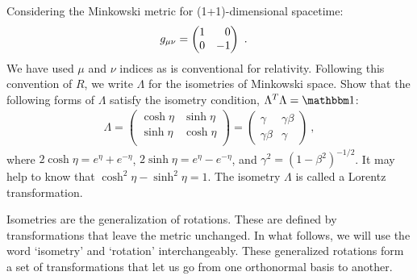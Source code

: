 \documentclass[12pt]{article}
\begin{document}
\begin{exercise}\label{ex:minkowski:2}
Considering the Minkowski metric for (1+1)-dimensional spacetime:
\begin{align}
    g_{\mu\nu} &= 
    \begin{pmatrix}
        1 & \pp 0\\
        0 & -1
    \end{pmatrix} \ .
\end{align}
We have used $\mu$ and $\nu$ indices as is conventional for relativity. Following this convention of $R$, we write $\Lambda$ for the isometries of Minkowski space. Show that the following forms of $\Lambda$ satisfy the isometry condition, $\Lambda^T \Lambda = \one$:
\begin{align}
    \Lambda = 
    \begin{pmatrix}
        \cosh\eta & \sinh\eta \\
        \sinh\eta & \cosh\eta\\
    \end{pmatrix}
    = 
    \begin{pmatrix}
        \gamma & \gamma\beta\\
        \gamma\beta & \gamma
    \end{pmatrix} \ ,
\end{align}
where $2\cosh\eta = e^{\eta}+e^{-\eta}$, $2\sinh\eta = e^{\eta}-e^{-\eta}$, and $\gamma^2 = (1-\beta^2)^{-1/2}$. It may help to know that $\cosh^2\eta-\sinh^2\eta = 1$. The isometry $\Lambda$ is called a Lorentz transformation.
\end{exercise}


\begin{bigidea}\label{eq:rotations:generalized}
Isometries are the generalization of rotations. These are defined by transformations that leave the metric unchanged. In what follows, we will use the word `isometry' and `rotation' interchangeably. These generalized rotations form a set of transformations that let us go from one orthonormal basis to another. 
\end{bigidea}
\end{document}
